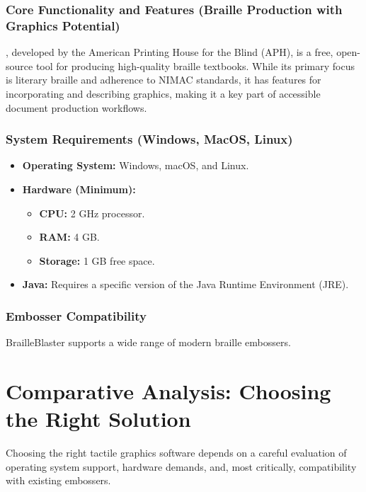 \subsubsection{Core Functionality and Features (Braille Production with Graphics Potential)}\label{ch14:sssec:brailleblaster-features}
, developed by the American Printing House for the Blind (APH), is a free, open-source tool for producing high-quality braille textbooks. While its primary focus is literary braille and adherence to NIMAC standards, it has features for incorporating and describing graphics, making it a key part of accessible document production workflows.

\subsubsection{System Requirements (Windows, MacOS, Linux)}\label{ch14:sssec:brailleblaster-sysreq}
\begin{itemize}
	\item \textbf{Operating System:} Windows, macOS, and Linux.
	\item \textbf{Hardware (Minimum):}
	      \begin{itemize}
		      \item \textbf{CPU:} 2 GHz processor.
		      \item \textbf{RAM:} 4 GB.
		      \item \textbf{Storage:} 1 GB free space.
	      \end{itemize}
	\item \textbf{Java:} Requires a specific version of the Java Runtime Environment (JRE).
\end{itemize}

\subsubsection{Embosser Compatibility}\label{ch14:sssec:brailleblaster-compat}
BrailleBlaster supports a wide range of modern braille embossers.

\section{Comparative Analysis: Choosing the Right Solution}\label{ch14:sec:comparative-analysis}
Choosing the right tactile graphics software depends on a careful evaluation of operating system support, hardware demands, and, most critically, compatibility with existing embossers.

